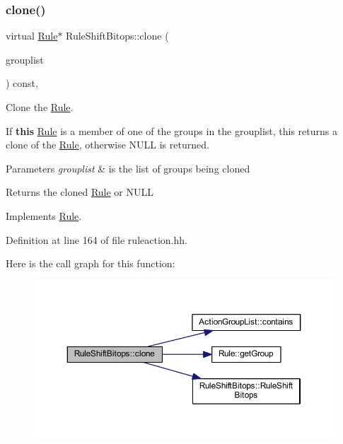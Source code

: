\subsubsection{\texorpdfstring{clone()}{clone()}}
{\footnotesize\ttfamily virtual \mbox{\hyperlink{class_rule}{Rule}}$\ast$ Rule\+Shift\+Bitops\+::clone (\begin{DoxyParamCaption}\item[{const \mbox{\hyperlink{class_action_group_list}{Action\+Group\+List}} \&}]{grouplist }\end{DoxyParamCaption}) const\hspace{0.3cm}{\ttfamily [inline]}, {\ttfamily [virtual]}}



Clone the \mbox{\hyperlink{class_rule}{Rule}}. 

If {\bfseries{this}} \mbox{\hyperlink{class_rule}{Rule}} is a member of one of the groups in the grouplist, this returns a clone of the \mbox{\hyperlink{class_rule}{Rule}}, otherwise N\+U\+LL is returned. 
\begin{DoxyParams}{Parameters}
{\em grouplist} & is the list of groups being cloned \\
\hline
\end{DoxyParams}
\begin{DoxyReturn}{Returns}
the cloned \mbox{\hyperlink{class_rule}{Rule}} or N\+U\+LL 
\end{DoxyReturn}


Implements \mbox{\hyperlink{class_rule_a70de90a76461bfa7ea0b575ce3c11e4d}{Rule}}.



Definition at line 164 of file ruleaction.\+hh.

Here is the call graph for this function\+:
\nopagebreak
\begin{figure}[H]
\begin{center}
\leavevmode
\includegraphics[width=350pt]{class_rule_shift_bitops_a3761b74c43ffef291151dc947761e17b_cgraph}
\end{center}
\end{figure}
\mbox{\label{class_rule_shift_bitops_ab97d4dba3828ab45c0d979c971b47b12}} 
